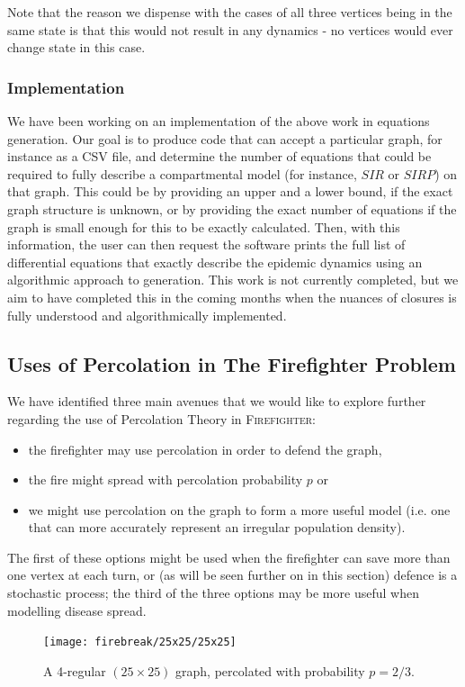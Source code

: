 \documentclass[../report.tex]{subfiles}
\begin{document}
Note that the reason we dispense with the cases of all three vertices being in the same state is that this would not result in any dynamics - no vertices would ever change state in this case. 

\subsubsection{Implementation}
\label{subsubsec:implementation}

We have been working on an implementation of the above work in equations generation. Our goal is to produce code that can accept a particular graph, for instance as a CSV file, and determine the number of equations that could be required to fully describe a compartmental model (for instance, $SIR$ or $SIRP$) on that graph. This could be by providing an upper and a lower bound, if the exact graph structure is unknown, or by providing the exact number of equations if the graph is small enough for this to be exactly calculated. Then, with this information, the user can then request the software prints the full list of differential equations that exactly describe the epidemic dynamics using an algorithmic approach to generation. This work is not currently completed, but we aim to have completed this in the coming months when the nuances of closures is fully understood and algorithmically implemented.

\subsection{Uses of Percolation in The Firefighter Problem}

We have identified three main avenues that we would like to explore further regarding the use of Percolation Theory in {\scshape Firefighter}: 
\begin{itemize}
	\item the firefighter may use percolation in order to defend the graph,
	\item the fire might spread with percolation probability $p$ or
	\item we might use percolation on the graph to form a more useful model (i.e. one that can more accurately represent an irregular population density).
\end{itemize}
The first of these options might be used when the firefighter can save more than one vertex at each turn, or (as will be seen further on in this section) defence is a stochastic process; the third of the three options may be more useful when modelling disease spread.
\begin{figure}[ht]
	\centering
		\texttt{[image: firebreak/25x25/25x25]}
	\caption{A 4-regular $(25\times25)$ graph, percolated with probability $p=2/3$.}
	\label{fig:largeperc}
\end{figure}
\end{document}
